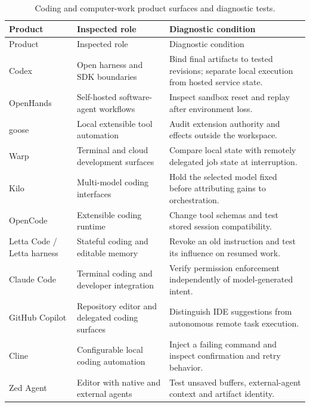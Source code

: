 \begingroup\setlength{\tabcolsep}{3pt}\small
\bookneedspace{.42\textheight}
\begin{longtable}{L{25mm}L{35mm}L{48mm}}
\caption{Coding and computer-work product surfaces and diagnostic tests.}\label{tab:C23:catalog}\\
\toprule Product & Inspected role & Diagnostic condition \\
\midrule\endfirsthead
\toprule Product & Inspected role & Diagnostic condition \\
\midrule\endhead
Codex\cite{executionproduct005} & Open harness and SDK boundaries & Bind final artifacts to tested revisions; separate local execution from hosted service state. \\
OpenHands\cite{executionproduct008} & Self-hosted software-agent workflows & Inspect sandbox reset and replay after environment loss. \\
goose\cite{executionproduct009} & Local extensible tool automation & Audit extension authority and effects outside the workspace. \\
Warp\cite{executionproduct013} & Terminal and cloud development surfaces & Compare local state with remotely delegated job state at interruption. \\
Kilo\cite{executionproduct015} & Multi-model coding interfaces & Hold the selected model fixed before attributing gains to orchestration. \\
OpenCode\cite{executionproduct016} & Extensible coding runtime & Change tool schemas and test stored session compatibility. \\
Letta Code / Letta harness\cite{executionproduct017} & Stateful coding and editable memory & Revoke an old instruction and test its influence on resumed work. \\
Claude Code\cite{executionproduct021} & Terminal coding and developer integration & Verify permission enforcement independently of model-generated intent. \\
GitHub Copilot\cite{executionproduct022} & Repository editor and delegated coding surfaces & Distinguish IDE suggestions from autonomous remote task execution. \\
Cline\cite{executionproduct023} & Configurable local coding automation & Inject a failing command and inspect confirmation and retry behavior. \\
Zed Agent\cite{executionproduct025} & Editor with native and external agents & Test unsaved buffers, external-agent context and artifact identity. \\

\end{longtable}
